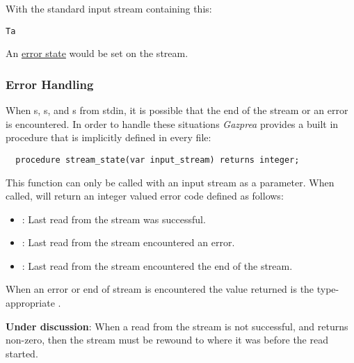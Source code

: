 \documentclass[../gazprea.tex]{subfiles}
\begin{document}
With the standard input stream containing this:
\begin{lstlisting}
Ta
\end{lstlisting}

An \hyperref[sssec:stream_error]{error state} would be set on the stream.


\subsubsection{Error Handling}
\label{sssec:stream_error}
When s, s, and s from stdin, it is possible that the end of
the stream or an error is encountered. In order to handle these situations \textit{Gazprea} provides
a built in procedure that is implicitly defined in every file:
\begin{lstlisting}
  procedure stream_state(var input_stream) returns integer;
\end{lstlisting}

This function can only be called with an input stream as a parameter. When called,
 will return an integer valued error code defined as follows:
\begin{itemize}
	\item {}: Last read from the stream was successful.
	\item {}: Last read from the stream encountered an error.
	\item {}: Last read from the stream encountered the end of the stream.
\end{itemize}

When an error or end of stream is encountered the value returned is the type-appropriate
.

\textbf{Under discussion}: When a read from the stream is not successful, and 
returns non-zero, then the stream must be rewound to where it was before the read started.
\end{document}
